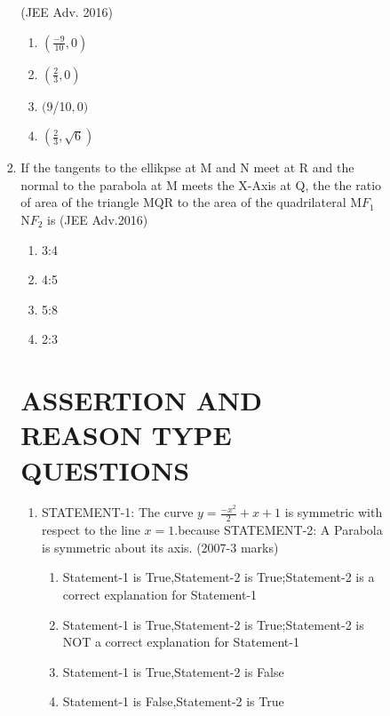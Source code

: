 \documentclass[journal,12pt,twocolumn]{IEEEtran}
\theoremstyle{remark}
\begin{document}
\begin{enumerate}
\begin{enumerate}
\begin{enumerate}
\begin{enumerate}
         \hfill(JEE Adv. 2016)
\begin{enumerate}
     \item $(\frac{-9}{10},0)$\\    
     \item $(\frac{2}{3},0)$\\     
     \item $($9/10$,0)$\\ 
    \item $(\frac{2}{3},\sqrt{6})$ 
    \end{enumerate}
\item If the tangents to the ellikpse at M and N meet at R and the normal to the parabola at M meets the X-Axis at Q, the the ratio of area of the triangle MQR to the area of the quadrilateral M$F_1$N$F_2$ is
\hfill(JEE Adv.2016)
\begin{enumerate}
    \item 3:4
    \item 4:5
    \item 5:8
    \item 2:3
\end{enumerate}
\section{ASSERTION AND REASON TYPE QUESTIONS}
\begin{enumerate}
\item STATEMENT-1: The curve $y=\frac{-x^2}{2}+x+1$ is symmetric with respect to the line $x=1$.because
STATEMENT-2: A Parabola is symmetric about its axis.
\hfill(2007-3 marks)
\begin{enumerate}
    \item Statement-1 is True,Statement-2 is True;Statement-2 is a correct explanation for Statement-1
    \item  Statement-1 is True,Statement-2 is True;Statement-2 is NOT a correct explanation for Statement-1
    \item Statement-1 is True,Statement-2 is False
    \item Statement-1 is False,Statement-2 is True
\end{enumerate}
\end{enumerate}

\end{enumerate}
\end{enumerate}
\end{enumerate}
\end{enumerate}
\end{document}
